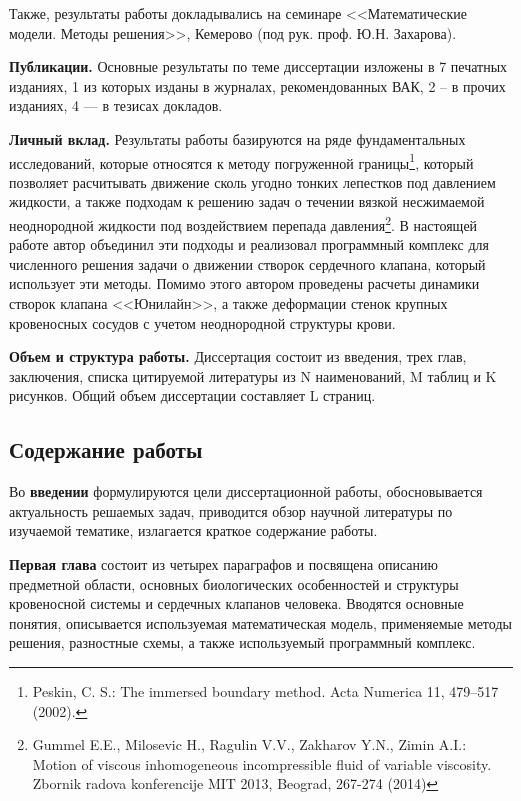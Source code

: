 Также, результаты работы докладывались на семинаре <<Математические модели.
Методы решения>>, Кемерово (под рук. проф. Ю.Н. Захарова).

\textbf{Публикации.} Основные результаты по теме диссертации изложены в 7
печатных изданиях, 1 из которых изданы в журналах, рекомендованных ВАК, 2 -- в
прочих изданиях, 4 --- в тезисах докладов.

\textbf{Личный вклад.} Результаты работы базируются на ряде фундаментальных
исследований, которые относятся к методу погруженной границы\footnote{ Peskin,
    C. S.: The immersed boundary method. Acta Numerica 11, 479–517 (2002).  },
который позволяет расчитывать движение сколь угодно тонких лепестков под
давлением жидкости, а также подходам к решению задач о течении вязкой
несжимаемой неоднородной жидкости под воздействием перепада давления\footnote{
    Gummel E.E., Milosevic H., Ragulin V.V., Zakharov Y.N., Zimin A.I.: Motion
    of viscous inhomogeneous incompressible fluid of variable viscosity.
    Zbornik radova konferencije MIT 2013, Beograd, 267-274 (2014) }. В
настоящей работе автор объединил эти подходы и реализовал программный комплекс
для численного решения задачи о движении створок сердечного клапана, который
использует эти методы. Помимо этого автором проведены расчеты динамики створок
клапана <<Юнилайн>>, а также деформации стенок крупных кровеносных сосудов с
учетом неоднородной структуры крови.

\textbf{Объем и структура работы.}
Диссертация состоит из введения, трех глав, заключения, списка цитируемой
литературы из {\todo N} наименований, {\todo M} таблиц и {\todo K} рисунков.
Общий объем диссертации составляет {\todo L} страниц.

\subsection*{\Large Содержание работы}
Во \textbf{введении} формулируются цели диссертационной работы,
обосновывается актуальность решаемых задач, приводится обзор научной
литературы по изучаемой тематике, излагается краткое содержание работы.

\textbf{Первая глава} состоит из четырех параграфов и посвящена описанию
предметной области, основных биологических особенностей и структуры кровеносной
системы и сердечных клапанов человека. Вводятся основные понятия, описывается
используемая математическая модель, применяемые методы решения, разностные
схемы, а также используемый программный комплекс.

